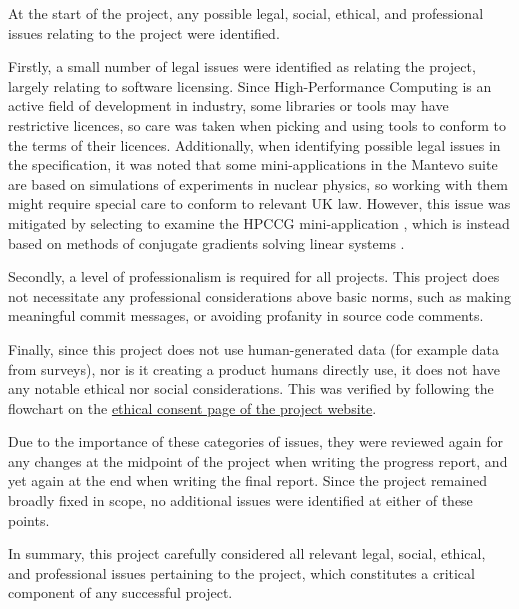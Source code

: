 At the start of the project, any possible legal, social, ethical, and professional issues relating to the project were identified. 

Firstly, a small number of legal issues were identified as relating the project, largely relating to software licensing. Since High-Performance Computing is an active field of development in industry, some libraries or tools may have restrictive licences, so care was taken when picking and using tools to conform to the terms of their licences. Additionally, when identifying possible legal issues in the specification, it was noted that some mini-applications in the Mantevo suite are based on simulations of experiments in nuclear physics, so working with them might require special care to conform to relevant UK law. However, this issue was mitigated by selecting to examine the HPCCG mini-application \cite{herouxHPCCGSolverPackage2007}, which is instead based on methods of conjugate gradients solving linear systems \cite{hestenesMethodsConjugateGradients1952}.

Secondly, a level of professionalism is required for all projects. This project does not necessitate any professional considerations above basic norms, such as making meaningful commit messages, or avoiding profanity in source code comments. %

Finally, since this project does not use human-generated data (for example data from surveys), nor is it creating a product humans directly use, it does not have any notable ethical nor social considerations. This was verified by following the flowchart on the \href{https://warwick.ac.uk/fac/sci/dcs/teaching/ethics}{ethical consent page of the project website}. %

Due to the importance of these categories of issues, they were reviewed again for any changes at the midpoint of the project when writing the progress report, and yet again at the end when writing the final report. Since the project remained broadly fixed in scope, no additional issues were identified at either of these points.

In summary, this project carefully considered all relevant legal, social, ethical, and professional issues pertaining to the project, which constitutes a critical component of any successful project.

